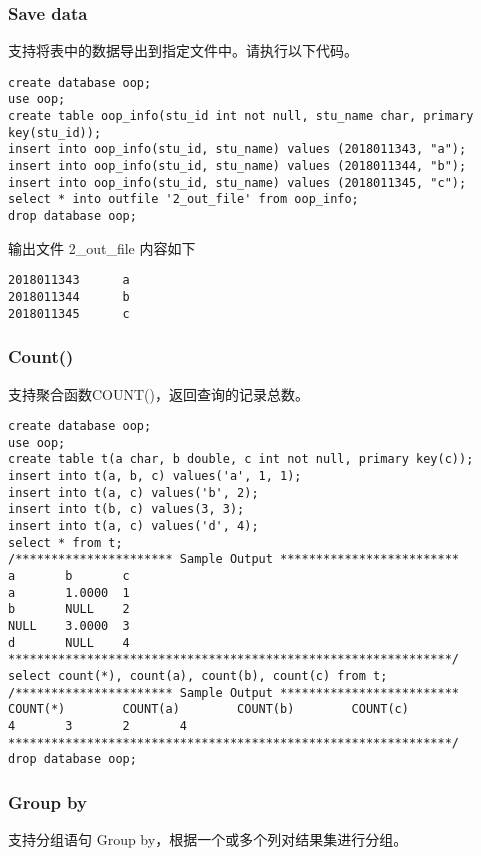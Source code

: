 \documentclass[12pt,a4paper]{article}
\begin{document}
\subsubsection{Save data}

支持将表中的数据导出到指定文件中。请执行以下代码。

\begin{lstlisting}
create database oop;
use oop;
create table oop_info(stu_id int not null, stu_name char, primary key(stu_id));
insert into oop_info(stu_id, stu_name) values (2018011343, "a");
insert into oop_info(stu_id, stu_name) values (2018011344, "b");
insert into oop_info(stu_id, stu_name) values (2018011345, "c");
select * into outfile '2_out_file' from oop_info;
drop database oop;
\end{lstlisting}

输出文件 2\_out\_file 内容如下

\begin{lstlisting}
2018011343      a
2018011344      b
2018011345      c
\end{lstlisting}

\subsubsection{Count()}

支持聚合函数COUNT()，返回查询的记录总数。

\begin{lstlisting}
create database oop;
use oop;
create table t(a char, b double, c int not null, primary key(c)); 
insert into t(a, b, c) values('a', 1, 1);
insert into t(a, c) values('b', 2); 
insert into t(b, c) values(3, 3); 
insert into t(a, c) values('d', 4); 
select * from t; 
/********************** Sample Output *************************
a       b       c
a       1.0000  1
b       NULL    2
NULL    3.0000  3
d       NULL    4
**************************************************************/
select count(*), count(a), count(b), count(c) from t; 
/********************** Sample Output *************************
COUNT(*)        COUNT(a)        COUNT(b)        COUNT(c)
4       3       2       4
**************************************************************/
drop database oop;
\end{lstlisting}

\subsubsection{Group by}

支持分组语句 Group by，根据一个或多个列对结果集进行分组。
\end{document}
